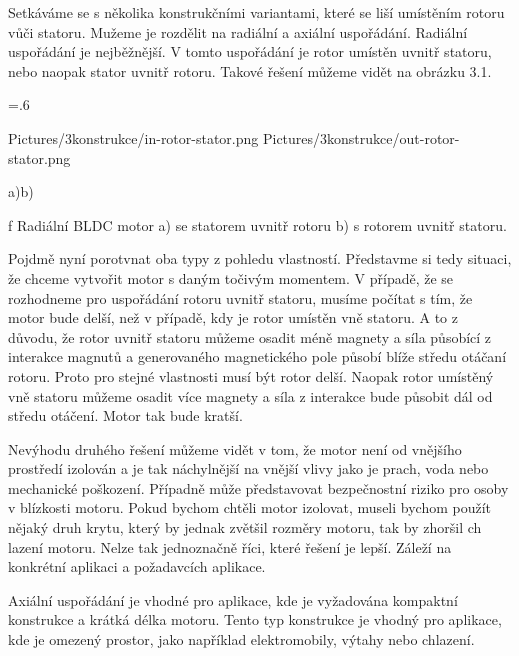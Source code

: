 Setkáváme se s několika konstrukčními variantami, které se liší umístěním rotoru vůči statoru. Mužeme je rozdělit na radiální a axiální uspořádání.
Radiální uspořádání je nejběžnější. V tomto uspořádání je rotor umístěn uvnitř statoru, nebo naopak stator uvnitř rotoru. Takové řešení můžeme vidět na obrázku 3.1.

\medskip
\picw=.6\hsize
{} %
\centerline {\inspic Pictures/3konstrukce/in-rotor-stator.png \hfil\hfil \inspic Pictures/3konstrukce/out-rotor-stator.png }\nobreak
\centerline {a)\hfil\hfil b)}\nobreak\medskip
\caption/f Radiální BLDC motor a) se statorem uvnitř rotoru b) s rotorem uvnitř statoru.
 \medskip

 Pojdmě nyní porotvnat oba typy z pohledu vlastností. Představme si tedy situaci, že chceme vytvořit motor s daným točivým momentem. 
 V případě, že se rozhodneme pro uspořádání rotoru uvnitř statoru, musíme počítat s tím, že motor bude delší, než v případě, kdy je rotor umístěn vně statoru. 
 A to z důvodu, že rotor uvnitř statoru můžeme osadit méně magnety a síla působící z interakce magnutů a generovaného magnetického pole působí blíže středu otáčaní rotoru. 
 Proto pro stejné vlastnosti musí být rotor delší. Naopak rotor umístěný vně statoru můžeme osadit více magnety a síla z interakce bude působit dál od středu otáčení. Motor tak bude kratší. 

 Nevýhodu druhého řešení můžeme vidět v tom, že motor není od vnějšího prostředí izolován a je tak náchylnější na vnější vlivy jako je prach, voda nebo mechanické poškození.
 Případně může představovat bezpečnostní riziko pro osoby v blízkosti motoru. Pokud bychom chtěli motor izolovat, museli bychom použít nějaký druh krytu, který by jednak zvětšil rozměry motoru, 
 tak by zhoršil ch lazení motoru. Nelze tak jednoznačně říci, které řešení je lepší. Záleží na konkrétní aplikaci a požadavcích aplikace.



Axiální uspořádání je vhodné pro aplikace, kde je vyžadována kompaktní konstrukce a krátká délka motoru.
Tento typ konstrukce je vhodný pro aplikace, kde je omezený prostor, jako například elektromobily, výtahy nebo chlazení.


